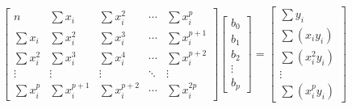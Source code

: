 \documentclass[12pt,a4paper]{article}
\begin{document}
\[
\begin{bmatrix}
n & \sum x_i & \sum x_i^2 & \cdots & \sum x_i^p \\
\sum x_i & \sum x_i^2 & \sum x_i^3 & \cdots & \sum x_i^{p+1} \\
\sum x_i^2 & \sum x_i^3 & \sum x_i^4 & \cdots & \sum x_i^{p+2} \\
\vdots & \vdots & \vdots & \ddots & \vdots \\
\sum x_i^p & \sum x_i^{p+1} & \sum x_i^{p+2} & \cdots & \sum x_i^{2p}
\end{bmatrix}
\begin{bmatrix} b_0 \\ b_1 \\ b_2 \\ \vdots \\ b_p \end{bmatrix}
=
\begin{bmatrix} \sum y_i \\ \sum (x_i y_i) \\ \sum (x_i^2 y_i) \\ \vdots \\ \sum (x_i^p y_i) \end{bmatrix}
\]
\end{document}
